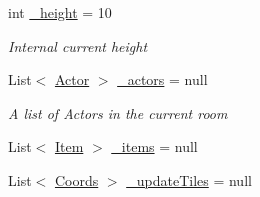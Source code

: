 \begin{DoxyCompactItemize}
\item 
int \hyperlink{class_gruppe22_1_1_backend_1_1_map_a69879990b9ce22a9fa0d31454d068b32}{\-\_\-height} = 10
\begin{DoxyCompactList}\small\item\em Internal current height \end{DoxyCompactList}\item 
List$<$ \hyperlink{class_gruppe22_1_1_backend_1_1_actor}{Actor} $>$ \hyperlink{class_gruppe22_1_1_backend_1_1_map_a29deb43269ce0e3dd577aafcd28aeb88}{\-\_\-actors} = null
\begin{DoxyCompactList}\small\item\em A list of Actors in the current room \end{DoxyCompactList}\item 
List$<$ \hyperlink{class_gruppe22_1_1_backend_1_1_item}{Item} $>$ \hyperlink{class_gruppe22_1_1_backend_1_1_map_a07ce05356ba78ac1470d64e0c736e190}{\-\_\-items} = null
\item 
List$<$ \hyperlink{class_gruppe22_1_1_backend_1_1_coords}{Coords} $>$ \hyperlink{class_gruppe22_1_1_backend_1_1_map_a1c8b19d3884fe44b1714ebec0256ce2a}{\-\_\-update\-Tiles} = null
\end{DoxyCompactItemize}
